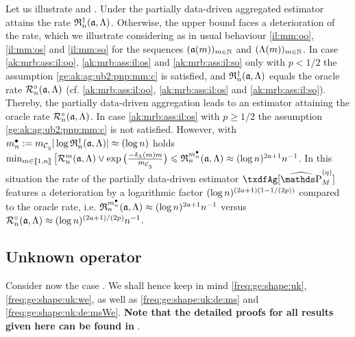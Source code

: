\begin{il}\label{ak:il:ub:np:mm}
  Let us illustrate   and
  . Under  the
  partially data-driven
aggregated estimator attains the rate $\naRa{(\xdfCw[],\Lambda)}$. Otherwise,
the upper bound faces a deterioration of the rate, which  we illustrate considering as in  usual
  behaviour  \ref{il:mm:oo}, \ref{il:mm:os} and \ref{il:mm:so}
 for the sequences $\Nsuite[\Di]{\xdfCw[(\Di)]}$ and
 $\Nsuite[\Di]{\iSv[\Di]}$.
 In case \ref{ak:mrb:ass:il:oo},
  \ref{ak:mrb:ass:il:os} and \ref{ak:mrb:ass:il:so} only with
  $p<1/2$ the assumption \ref{ge:ak:ag:ub2:pnp:mm:c} is satisfied, and
  $\naRa{(\xdfCw[],\Lambda)}$ equals the oracle rate $\oRa{\xdfCw[],\Lambda}$ (cf.
   \ref{ak:mrb:ass:il:oo},
  \ref{ak:mrb:ass:il:os} and \ref{ak:mrb:ass:il:so}). Thereby, the
  partially data-driven aggregation leads to an estimator attaining
  the oracle rate $\oRa{\xdfCw[],\Lambda}$. In case \ref{ak:mrb:ass:il:os}
  with $p\geq1/2$ the assumption \ref{ge:ak:ag:ub2:pnp:mm:c} is not
  satisfied. However, with
  $\sDi{\ssY}:=\Di_{\cst{3}} \vert \log\naRa{(\xdfCw[],\Lambda)} \vert \approx(\log\ssY)$ holds
  $\min_{\Di\in\nset{1,\ssY}}\big[\dRa{\Di}{\xdfCw[],\Lambda}\vee\exp\big(\tfrac{-\cmiSv\Di}{\Di_{\cst{3}}}\big)\leq\daRa{\sDi{\ssY}}{(\xdfCw[],\Lambda)}\approx(\log\ssY)^{2a+1}\ssY^{-1}$.
  In this situation the rate of the partially data-driven estimator
  $\txdfAg[{\erWe[]}]$ features a deterioration by a logarithmic factor
  $(\log\ssY)^{(2a+1)(1-1/(2p))}$ compared to the oracle rate, i.e.
  $\daRa{\sDi{\ssY}}{(\xdfCw[],\Lambda)}\approx(\log\ssY)^{2a+1}\ssY^{-1}$ versus
  $\oRa{\xdfCw[],\Lambda}\approx(\log\ssY)^{(2a+1)/(2p)}\ssY^{-1}$.\ilEnd
\end{il}


\subsection{Unknown operator}\label{freq:ge:strat:uk}\label{FREQ:GE:STRAT:UK}
Consider now the case .
We shall hence keep in mind \ref{freq:ge:shape:uk}, \ref{freq:ge:shape:uk:we},  as well as \ref{freq:ge:shape:uk:de:ms} and \ref{freq:ge:shape:uk:de:msWe}.
\textbf{Note that the detailed proofs for all results given here can be found in }.


